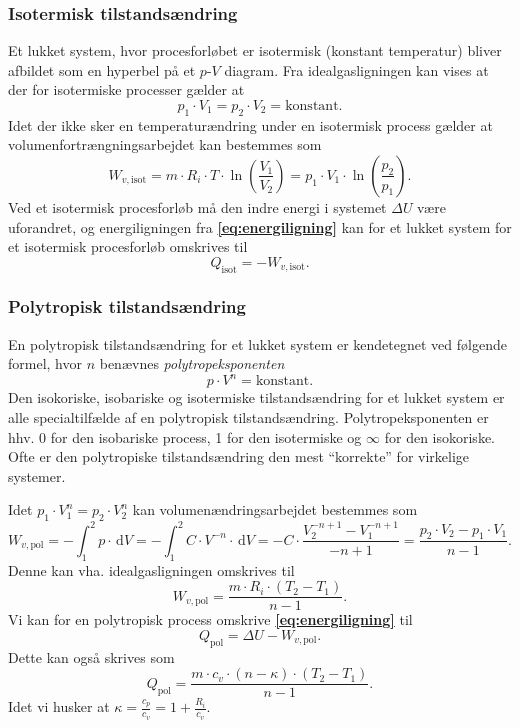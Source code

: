 \subsubsection{Isotermisk tilstandsændring}
Et lukket system, hvor procesforløbet er isotermisk (konstant temperatur) bliver afbildet som en hyperbel på et $p$-$V$ diagram. Fra idealgasligningen kan vises at der for isotermiske processer gælder at
\[ 
p_1 \cdot V_1 = p_2 \cdot V_2 = \mathrm{konstant}
.\]
Idet der ikke sker en temperaturændring under en isotermisk process gælder at volumenfortrængningsarbejdet kan bestemmes som
\[ 
W_{v, \text{isot}} = m \cdot R_i \cdot T \cdot \ln \left( \frac{V_1}{V_2} \right) = p_1 \cdot V_1 \cdot \ln \left( \frac{p_2}{p_1} \right)
.\]
Ved et isotermisk procesforløb må den indre energi i systemet $\Delta U$ være uforandret, og energiligningen fra \textbf{\autoref{eq:energiligning}} kan for et lukket system for et isotermisk procesforløb omskrives til
\[ 
Q_{\text{isot}} = - W_{v, \text{isot}}
.\]

\subsubsection{Polytropisk tilstandsændring}
En polytropisk tilstandsændring for et lukket system er kendetegnet ved følgende formel, hvor $n$ benævnes \textit{polytropeksponenten}
\[ 
p \cdot V^{n} = \mathrm{konstant}
.\]
Den isokoriske, isobariske og isotermiske tilstandsændring for et lukket system er alle specialtilfælde af en polytropisk tilstandsændring. Polytropeksponenten er hhv. 0 for den isobariske process, 1 for den isotermiske og $\infty $ for den isokoriske. Ofte er den polytropiske tilstandsændring den mest ``korrekte'' for virkelige systemer. 

Idet $p_1 \cdot V_1^{n} = p_2 \cdot V_2^{n}$ kan volumenændringsarbejdet bestemmes som
\[ 
W_{v, \text{pol}} = - \int_{1}^{2} p \cdot \, \mathrm{d}V = -\int_{1}^{2} C \cdot V^{-n} \cdot \, \mathrm{d}V = - C \cdot \frac{V_2^{-n+1} - V_1^{-n+1}}{-n+1} = \frac{p_2 \cdot V_2 - p_1 \cdot V_1}{n-1}
.\]
Denne kan vha. idealgasligningen omskrives til
\[ 
W_{v, \text{pol}} = \frac{m \cdot R_i \cdot \left( T_2 - T_1 \right)}{n-1}
.\]
Vi kan for en polytropisk process omskrive \textbf{\autoref{eq:energiligning}} til
\[ 
Q_{\text{pol}} = \Delta U - W_{v, \text{pol}}
.\]
Dette kan også skrives som
\[ 
Q_{\text{pol}} = \frac{m \cdot c_v \cdot (n-\kappa) \cdot (T_2 - T_1)}{n-1}
.\]
Idet vi husker at $\kappa = \frac{c_p}{c_v} = 1 + \frac{R_i}{c_v}$.
